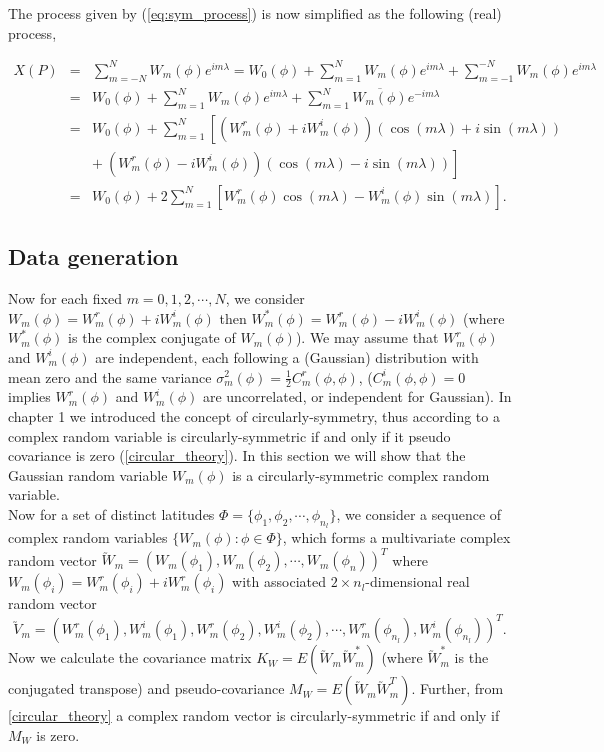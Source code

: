 	The process given by (\ref{eq:sym_process}) is now simplified as the following (real) process,
			
	\begin{eqnarray} \label{eq:finite_process}
		X(P) &=& \sum_{m = -N}^N W_m(\phi) e^{im \lambda} =  W_0(\phi) + \sum_{m =1}^N W_m(\phi) e^{im \lambda} + \sum_{m =-1}^{-N} W_m(\phi) e^{im \lambda} \nonumber \\
		&=& W_0(\phi) + \sum_{m =1}^N W_m(\phi) e^{im \lambda} + \sum_{m =1}^{N} \overline{W_m(\phi)} e^{-im \lambda} \nonumber \\
		&=& W_0(\phi) + \sum_{m =1}^N \left[  (W_m^r(\phi)+iW_m^i(\phi))(\cos(m \lambda) + i \sin(m \lambda)) \right. \nonumber \\
		& & \left. +\ (W_m^r(\phi)-iW_m^i(\phi))(\cos(m \lambda) - i \sin(m \lambda))  \right]  \nonumber \\
		&=& W_0(\phi) + 2 \sum_{m =1}^N \left[W_m^r(\phi)\cos(m\lambda) - W_m^i(\phi)\sin(m \lambda)\right].
	\end{eqnarray}
			
			
			
	\subsection{Data generation}
			
	Now for each fixed $m = 0, 1, 2, \cdots, N$, we consider  $W_m(\phi) = W_m^r(\phi) + i W_m^i(\phi)$ then $W_m^*(\phi) = W_m^r(\phi) - i W_m^i(\phi)$ (where $W_m^*(\phi)$ is the complex conjugate of $W_m(\phi)$). We may assume that $W_m^r(\phi)$ and $W_m^i(\phi)$ are independent, each following a (Gaussian) distribution with mean zero and the same variance $\sigma_m^2(\phi) = \frac{1}{2}C_m^r(\phi, \phi)$, ($C_m^i(\phi, \phi) = 0$ implies $W_m^r(\phi)$ and $W_m^i(\phi)$ are uncorrelated, or independent for Gaussian). In chapter 1 we introduced the concept of circularly-symmetry, thus according to \cite{Gallager2008} a complex random variable is circularly-symmetric if and only if it pseudo covariance is zero (\ref{circular_theory}). In this section we will show that the Gaussian random variable $W_m(\phi)$ is a circularly-symmetric complex random variable.  \\
			
	Now for a set of distinct latitudes $\Phi = \{\phi_1, \phi_2, \cdots, \phi_{n_l}\}$, we consider a sequence of complex random variables $\{W_m(\phi): \phi \in \Phi\}$, which forms a multivariate complex random vector $\utilde{W}_m = (W_m(\phi_1), W_m(\phi_2), \cdots, W_m(\phi_n))^T$ where $W_m(\phi_i) = W_m^r(\phi_i) + iW_m^r(\phi_i)$ with associated $2\times n_l$-dimensional real random vector
	$$\utilde{V}_m = (W_m^r(\phi_1), W_m^i(\phi_1),W_m^r(\phi_2), W_m^i(\phi_2),\cdots, W_m^r(\phi_{n_l}), W_m^i(\phi_{n_l}))^T.$$
	Now we calculate the covariance matrix $K_W = E(\utilde{W}_m\utilde{W}_m^*)$ (where $\utilde{W}_m^*$ is the conjugated transpose) and pseudo-covariance $M_W = E(\utilde{W}_m\utilde{W}_m^T)$. Further, from \ref{circular_theory} a complex random vector is circularly-symmetric if and only if $M_W$ is zero.
			
